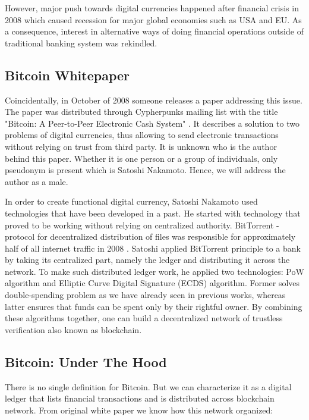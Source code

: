 \documentclass[conference,compsoc]{IEEEtran}
\begin{document}
However, major push towards digital currencies happened after financial crisis in 2008 which caused recession for major global economies such as USA and EU.
As a consequence, interest in alternative ways of doing financial operations outside of traditional banking system was rekindled. 


\subsection{Bitcoin Whitepaper}
Coincidentally, in October of 2008 someone releases a paper addressing this issue. 
The paper was distributed through Cypherpunks mailing list with the title "Bitcoin: A Peer-to-Peer Electronic Cash System" \cite{whitepaper}. 
It describes a solution to two problems of digital currencies, thus allowing to send electronic transactions without relying on trust from third party. 
It is unknown who is the author behind this paper. 
Whether it is one person or a group of individuals, only pseudonym is present which is Satoshi Nakamoto. Hence, we will address the author as a male.

In order to create functional digital currency, Satoshi Nakamoto used technologies that have been developed in a past. 
He started with technology that proved to be working without relying on centralized authority.    
BitTorrent - protocol for decentralized distribution of files was responsible for approximately half of all internet traffic in 2008 \cite{p2p}. 
Satoshi applied BitTorrent principle to a bank by taking its centralized part, namely the ledger and distributing it across the network. 
To make such distributed ledger work, he applied two technologies: PoW algorithm and Elliptic Curve Digital Signature (ECDS) algorithm.
Former solves double-spending problem as we have already seen in previous works, whereas latter ensures that funds can be spent only by their rightful owner.
By combining these algorithms together, one can build a decentralized network of trustless verification also known as blockchain. 

\subsection{Bitcoin: Under The Hood}
There is no single definition for Bitcoin.
But we can characterize it as a digital ledger that lists financial transactions and is distributed across blockchain network. 
From original white paper \cite{whitepaper} we know how this network organized: 
\end{document}
